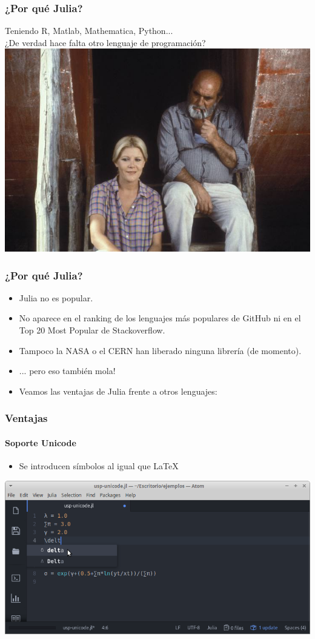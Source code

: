 \documentclass{beamer}
\begin{document}
\begin{frame}
\frametitle{¿Por qué Julia?}
\begin{center}
Teniendo R, Matlab, Mathematica, Python...\\
¿De verdad hace falta otro lenguaje de programación?\\[0.5cm]
\includegraphics{images/1316694066614.jpg}	
\end{center}
\end{frame}

\begin{frame}
\frametitle{¿Por qué Julia?}
\begin{itemize}
	\item Julia no es popular. 
	\item No aparece en el ranking de los lenguajes más populares de GitHub ni en el Top 20 Most Popular de Stackoverflow.
	\item Tampoco la NASA o el CERN han liberado ninguna librería (de momento).
	\item ... pero eso también mola!
	\item Veamos las ventajas de Julia frente a otros lenguajes:
\end{itemize}
\end{frame}

\begin{frame}
\frametitle{Ventajas}
\framesubtitle{Soporte Unicode}
\begin{itemize}
	\item Se introducen símbolos al igual que \LaTeX
\end{itemize}
\includegraphics[scale=0.40]{images/julia-unicode}
\end{frame}
\end{document}
